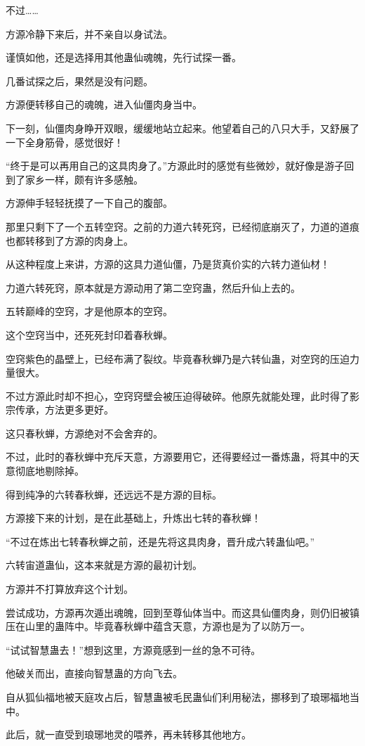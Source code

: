\begin{this_body}
不过……

方源冷静下来后，并不亲自以身试法。

谨慎如他，还是选择用其他蛊仙魂魄，先行试探一番。

几番试探之后，果然是没有问题。

方源便转移自己的魂魄，进入仙僵肉身当中。

下一刻，仙僵肉身睁开双眼，缓缓地站立起来。他望着自己的八只大手，又舒展了一下全身筋骨，感觉很好！

“终于是可以再用自己的这具肉身了。”方源此时的感觉有些微妙，就好像是游子回到了家乡一样，颇有许多感触。

方源伸手轻轻抚摸了一下自己的腹部。

那里只剩下了一个五转空窍。之前的力道六转死窍，已经彻底崩灭了，力道的道痕也都转移到了方源的肉身上。

从这种程度上来讲，方源的这具力道仙僵，乃是货真价实的六转力道仙材！

力道六转死窍，原本就是方源动用了第二空窍蛊，然后升仙上去的。

五转巅峰的空窍，才是他原本的空窍。

这个空窍当中，还死死封印着春秋蝉。

空窍紫色的晶壁上，已经布满了裂纹。毕竟春秋蝉乃是六转仙蛊，对空窍的压迫力量很大。

不过方源此时却不担心，空窍窍壁会被压迫得破碎。他原先就能处理，此时得了影宗传承，方法更多更好。

这只春秋蝉，方源绝对不会舍弃的。

不过，此时的春秋蝉中充斥天意，方源要用它，还得要经过一番炼蛊，将其中的天意彻底地剔除掉。

得到纯净的六转春秋蝉，还远远不是方源的目标。

方源接下来的计划，是在此基础上，升炼出七转的春秋蝉！

“不过在炼出七转春秋蝉之前，还是先将这具肉身，晋升成六转蛊仙吧。”

六转宙道蛊仙，这本来就是方源的最初计划。

方源并不打算放弃这个计划。

尝试成功，方源再次遁出魂魄，回到至尊仙体当中。而这具仙僵肉身，则仍旧被镇压在山里的蛊阵中。毕竟春秋蝉中蕴含天意，方源也是为了以防万一。

“试试智慧蛊去！”想到这里，方源竟感到一丝的急不可待。

他破关而出，直接向智慧蛊的方向飞去。

自从狐仙福地被天庭攻占后，智慧蛊被毛民蛊仙们利用秘法，挪移到了琅琊福地当中。

此后，就一直受到琅琊地灵的喂养，再未转移其他地方。


\end{this_body}
